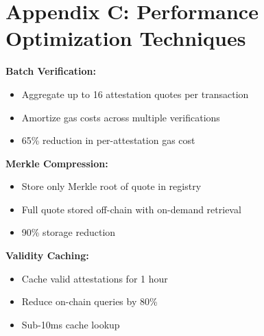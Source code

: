 \section{Appendix C: Performance Optimization Techniques}


\textbf{Batch Verification:}
\begin{itemize}
\item Aggregate up to 16 attestation quotes per transaction
\item Amortize gas costs across multiple verifications
\item 65\% reduction in per-attestation gas cost
\end{itemize}

\textbf{Merkle Compression:}
\begin{itemize}
\item Store only Merkle root of quote in registry
\item Full quote stored off-chain with on-demand retrieval
\item 90\% storage reduction
\end{itemize}

\textbf{Validity Caching:}
\begin{itemize}
\item Cache valid attestations for 1 hour
\item Reduce on-chain queries by 80\%
\item Sub-10ms cache lookup
\end{itemize}

